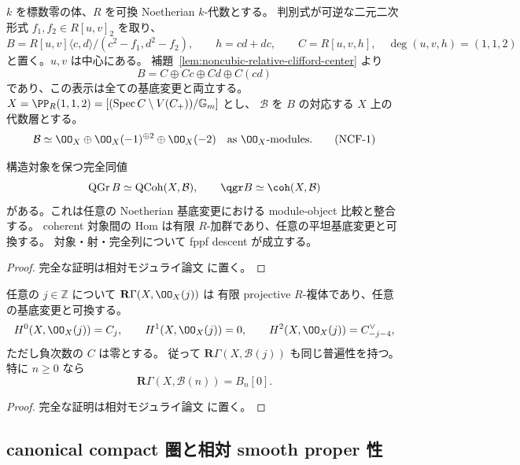 $k$ を標数零の体、$R$ を可換 Noetherian $k$-代数とする。
判別式が可逆な二元二次形式 $f_1,f_2\in R[u,v]_2$ を取り、
\[
 B=R[u,v]\langle c,d\rangle/(c^2-f_1,d^2-f_2),
 \qquad h=cd+dc,
 \qquad C=R[u,v,h],\quad\deg(u,v,h)=(1,1,2)
\]
と置く。$u,v$ は中心にある。
補題~\ref{lem:noncubic-relative-clifford-center} より
\[
 B=C\oplus Cc\oplus Cd\oplus C(cd)
\]
であり、この表示は全ての基底変更と両立する。
$X=\PP_R(1,1,2)=[(\operatorname{Spec} C\setminus V(C_+))/\mathbb G_m]$ とし、
$\mathcal B$ を $B$ の対応する $X$ 上の代数層とする。
\[
 \mathcal B\simeq\OO_X\oplus\OO_X(-1)^{\oplus2}\oplus\OO_X(-2)
 \quad\text{as }\OO_X\text{-modules}.
 \tag{NCF-1}\label{eq:nc-clifford-sheaf}
\]

\begin{proposition}\label{prop:nc-qgr-weighted}
構造対象を保つ完全同値
\[
 \operatorname{QGr} B\simeq\operatorname{QCoh}(X,\mathcal B),\qquad
 \qgr B\simeq\coh(X,\mathcal B)
\]
がある。これは任意の Noetherian 基底変更における module-object 比較と整合する。
coherent 対象間の Hom は有限 $R$-加群であり、任意の平坦基底変更と可換する。
対象・射・完全列について fppf descent が成立する。
\end{proposition}

\begin{proof}
完全な証明は相対モジュライ論文 \cite[\texttt{relative_noncubic_families}]{QuadricModuli2026} に置く。
\end{proof}

\begin{lemma}\label{lem:nc-weighted-cohomology}
任意の $j\in\mathbb Z$ について $\mathbf R\Gamma(X,\OO_X(j))$ は
有限 projective $R$-複体であり、任意の基底変更と可換する。
\[
 H^0(X,\OO_X(j))=C_j,\qquad H^1(X,\OO_X(j))=0,
 \qquad H^2(X,\OO_X(j))=C_{-j-4}^{\vee},
\]
ただし負次数の $C$ は零とする。
従って $\mathbf R\Gamma(X,\mathcal B(j))$ も同じ普遍性を持つ。
特に $n\ge0$ なら
\[
 \mathbf R\Gamma(X,\mathcal B(n))=B_n[0].
 \tag{NCF-2}\label{eq:nc-full-orbit-cohomology}
\]
\end{lemma}

\begin{proof}
完全な証明は相対モジュライ論文 \cite[\texttt{relative_noncubic_families}]{QuadricModuli2026} に置く。
\end{proof}

\subsection{canonical compact 圏と相対 smooth proper 性}

